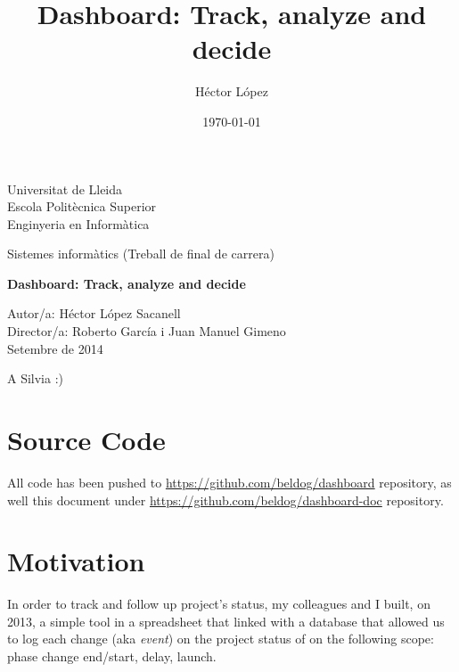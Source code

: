 \documentclass[a4paper,12pt,english]{book}
\newenvironment{dedication}
{
   \cleardoublepage
   \thispagestyle{empty}
   \vspace*{\stretch{1}}
   \hfill\begin{minipage}[t]{0.15\textwidth}
   \raggedright
}%
{
   \end{minipage}
   \vspace*{\stretch{3}}
   \clearpage
}
\begin{document}
\clearpage\thispagestyle{empty}

\begin{framed}
	\begin{center}
	Universitat de Lleida \\ \medskip
	Escola Politècnica Superior \\ \medskip
	Enginyeria en Informàtica \\ \bigskip \bigskip
	
	Sistemes informàtics (Treball de final de carrera) \\ \bigskip \bigskip 
	
	\textbf{Dashboard: Track, analyze and decide}
	\end{center}

	\bigskip
	
	\raggedleft
	Autor/a: Héctor López Sacanell\\
	Director/a: Roberto García i Juan Manuel Gimeno\\
	Setembre de 2014
	\bigskip
\end{framed}

\title{Dashboard: Track, analyze and decide}
\author{Héctor López}

\date{\today}

\begin{dedication}
A Silvia :)
\end{dedication}

%

\tableofcontents


\chapter*{Source Code}
All code has been pushed to \url{https://github.com/beldog/dashboard}
repository, as well this document under \url{https://github.com/beldog/dashboard-doc} repository.

\chapter*{Motivation}
In order to track and follow up project's status, my colleagues and I
built, on 2013, a simple tool in a spreadsheet that linked with a database that
allowed us to log each change (aka \emph{event}) on the project status of on
the following scope: phase change end/start, delay, launch.
\end{document}
